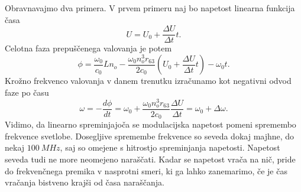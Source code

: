Obravnavajmo dva primera. V prvem primeru naj bo 
napetost linearna funkcija časa 
\begin{equation}
U= U_0 + \frac{\Delta U}{\Delta t}t.
\end{equation}
Celotna faza prepuščenega valovanja je potem
\begin{equation}
\phi = \frac{\omega_0}{c_0}L n_o - \frac{\omega_0 n_o^3 r_{63}}{2c_0}\left( U_0 + 
\frac{\Delta U}{\Delta t}t\right) - \omega_0 t.
\end{equation}
Krožno frekvenco valovanja v danem trenutku izračunamo kot negativni odvod faze po času
\begin{equation}
\omega = -\frac{d\phi}{dt} = \omega_0 + \frac{\omega_0 n_o^3 r_{63}}{2c_0}\frac{\Delta U}{\Delta t} =
\omega_0 + \Delta \omega.
\end{equation}
Vidimo, da linearno spreminjajoča se modulacijska napetost pomeni spremembo frekvence svetlobe. 
Dosegljive spremembe frekvence so seveda dokaj majhne,
do nekaj $100~\si{MHz}$, saj so omejene s hitrostjo spreminjanja napetosti.
Napetost seveda tudi ne more neomejeno naraščati. Kadar se napetost
vrača na nič, pride do frekvenčnega premika v nasprotni smeri, ki  ga
lahko zanemarimo, če je čas vračanja bistveno krajši od časa naraščanja.


